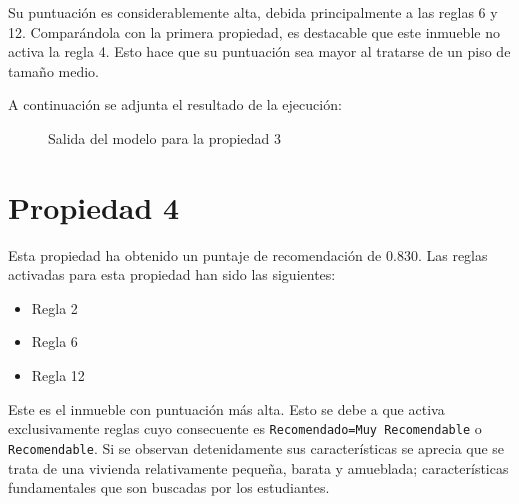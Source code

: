 \documentclass[12pt]{report} %
\begin{document}
    Su puntuación es considerablemente alta, debida principalmente a las reglas
    6 y 12. Comparándola con la primera propiedad, es destacable que este
    inmueble no activa la regla 4. Esto hace que su puntuación sea mayor al
    tratarse de un piso de tamaño medio.

    A continuación se adjunta el resultado de la ejecución:
    \begin{figure}[H]
        \centering
        \caption{Salida del modelo para la propiedad 3}
    \end{figure}

    \section{Propiedad 4}
    Esta propiedad ha obtenido un puntaje de recomendación de $0.830$. Las reglas activadas para esta propiedad han sido las siguientes: 
    \begin{itemize}
        \item Regla 2
        \item Regla 6
        \item Regla 12
    \end{itemize}
    
    Este es el inmueble con puntuación más alta. Esto se debe a que activa
    exclusivamente reglas cuyo consecuente es \texttt{Recomendado=Muy
    Recomendable} o \texttt{Recomendable}. Si se observan detenidamente sus
    características se aprecia que se trata de una vivienda relativamente
    pequeña, barata y amueblada; características fundamentales que son buscadas
    por los estudiantes.
\end{document}
